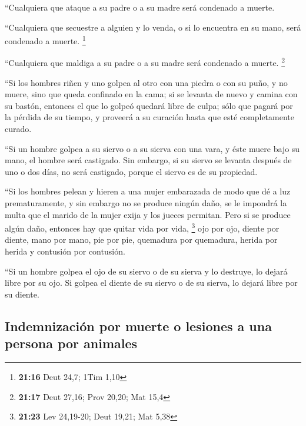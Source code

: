  ``Cualquiera que ataque a su padre o a su madre será
condenado a muerte.

 ``Cualquiera que secuestre a alguien y lo venda, o si lo
encuentra en su mano, será condenado a muerte. \footnote{\textbf{21:16}
  Deut 24,7; 1Tim 1,10}

 ``Cualquiera que maldiga a su padre o a su madre será
condenado a muerte. \footnote{\textbf{21:17} Deut 27,16; Prov 20,20; Mat
  15,4}

 ``Si los hombres riñen y uno golpea al otro con una
piedra o con su puño, y no muere, sino que queda confinado en la cama;
 si se levanta de nuevo y camina con su bastón, entonces
el que lo golpeó quedará libre de culpa; sólo que pagará por la pérdida
de su tiempo, y proveerá a su curación hasta que esté completamente
curado.

 ``Si un hombre golpea a su siervo o a su sierva con una
vara, y éste muere bajo su mano, el hombre será castigado.
 Sin embargo, si su siervo se levanta después de uno o
dos días, no será castigado, porque el siervo es de su propiedad.

 ``Si los hombres pelean y hieren a una mujer embarazada
de modo que dé a luz prematuramente, y sin embargo no se produce ningún
daño, se le impondrá la multa que el marido de la mujer exija y los
jueces permitan.  Pero si se produce algún daño, entonces
hay que quitar vida por vida, \footnote{\textbf{21:23} Lev 24,19-20;
  Deut 19,21; Mat 5,38}  ojo por ojo, diente por diente,
mano por mano, pie por pie,  quemadura por quemadura,
herida por herida y contusión por contusión.

 ``Si un hombre golpea el ojo de su siervo o de su sierva
y lo destruye, lo dejará libre por su ojo.  Si golpea el
diente de su siervo o de su sierva, lo dejará libre por su diente.

\hypertarget{indemnizaciuxf3n-por-muerte-o-lesiones-a-una-persona-por-animales}{%
\subsection{Indemnización por muerte o lesiones a una persona por
animales}\label{indemnizaciuxf3n-por-muerte-o-lesiones-a-una-persona-por-animales}}

